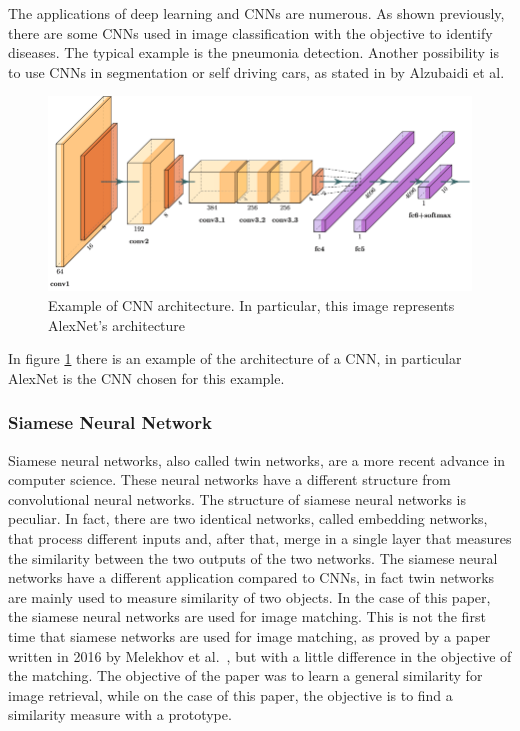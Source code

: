 \documentclass[conference]{IEEEtran}
\begin{document}
					\noindent The applications of deep learning and CNNs are numerous. As shown previously, there are some CNNs used in image classification with the objective to identify diseases. The typical example is 
					the pneumonia detection. Another possibility is to use CNNs in segmentation or self driving cars, as stated in \cite{alzubaidi2021review} by Alzubaidi et al.
			
					\begin{figure}[!ht]
						\centerline{\includegraphics[width=\linewidth]{imgs/cnn_architecture.png}}
						\caption{Example of CNN architecture. In particular, this image represents AlexNet's architecture}
						\label{fig:5}
					\end{figure}
					
					\noindent In figure \ref{fig:5} there is an example of the architecture of a CNN, in particular AlexNet is the CNN chosen for this example. 
					
				\subsubsection{Siamese Neural Network}

					Siamese neural networks, also called twin networks, are a more recent advance in computer science. These neural networks have a different structure from convolutional neural networks. The 
					structure of siamese neural networks is peculiar. In fact, there are two identical networks, called embedding networks, that process different inputs and, after that, 
					merge in a single layer that measures the similarity between 
					the two outputs of the two networks. The siamese neural networks have a different application compared to CNNs, in fact twin networks are mainly used to measure similarity of two objects. 
					In the case of this paper, the siamese neural networks are used for image matching. This is not the first time that siamese networks are used for image matching, as proved by a paper written in 2016 by 
					Melekhov et al.~\cite{melekhov2016siamese}, but with a little difference in the objective of the matching. The objective of the paper was to learn a general similarity for image retrieval, while on the case of this 
					paper, the objective is to find a similarity measure with a prototype. 
					
\end{document}
